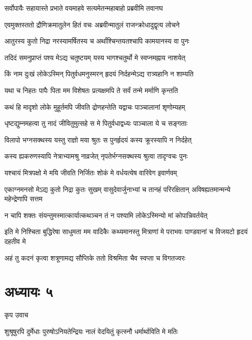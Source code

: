 \twolineshloka
{सर्वोपायैः सहायास्ते प्रभाते वयमाहवे}
{सत्यमेतन्महाबाहो प्रब्रवीमि तवानघ}


\twolineshloka
{एवमुक्तस्ततो द्रौणिक्रमातुलेन हितं वचः}
{अब्रवीन्मातुलं राजन्क्रोधादुद्वृत्य लोचने}


\twolineshloka
{आतुरस्य कुतो निद्रा नरस्यामर्षितस्य च}
{अर्थांश्चिन्तयतश्चापि कामयानस्य वा पुनः}


\twolineshloka
{तदिदं समनुप्राप्तं पश्य मेऽद्य चतुष्टयम्}
{यस्य भागश्चतुर्थो मे स्वप्नमह्नाय नाशयेत्}


\twolineshloka
{किं नाम दुःखं लोकेऽस्मिन् पितुर्वधमनुस्मरन्}
{हृदयं निर्दहन्मेऽद्य रात्र्यहानि न शाम्यति}


\twolineshloka
{यथा च निहतः पापैः पिता मम विशेषतः}
{प्रत्यक्षमपि ते सर्वं तन्मे मर्माणि कृन्तति}


\twolineshloka
{कथं हि मादृशो लोके मुहूर्तमपि जीवति}
{द्रोणहन्तेति यद्वाचः पाञ्चालानां शृणोम्यहम्}


\twolineshloka
{धृष्टद्युम्नमहत्वा तु नादं जीवितुमुत्सहे}
{स मे पितुर्वधाद्वध्यः पाञ्चाला ये च सङ्गताः}


\twolineshloka
{विलापो भग्नसक्थस्य यस्तु राज्ञो मया श्रुतः}
{स पुनर्हृदयं कस्य क्रूरस्यापि न निर्दहेत्}


\twolineshloka
{कस्य ह्यकरुणस्यापि नेत्राभ्यामश्रु नाव्रजेत्}
{नृपतेर्भग्नसक्थस्य श्रुत्वा तादृग्वचः पुनः}


\twolineshloka
{यश्चायं मित्रपक्षो मे मयि जीवति निर्जितः}
{शोकं मे वर्धयत्येष वारिवेग इवार्णवम्}


एकाग्नमनसो मेऽद्य कुतो निद्रा कुतः सुखम्
\twolineshloka
{वासुदेवार्जुनाभ्यां च तानहं परिरक्षितान्}
{अविषह्यतमान्मन्ये महेन्द्रेणापि सत्तम}


\twolineshloka
{न चापि शक्तः संयन्तुमस्मात्कार्यात्कथञ्चन}
{तं न पश्यामि लोकेऽस्मिन्यो मां कोपान्निवर्तयेत्}


इति मे निश्चिता बुद्धिरेषा साधुमता मम
\twolineshloka
{वादिकैः कथ्यमानस्तु मित्राणां मे पराभवः}
{पाण्डवानां च विजयटो हृदयं दहतीव मे}


\twolineshloka
{अहं तु कदनं कृत्वा शत्रूणामद्य सौप्तिके}
{ततो विश्रमिता चैव स्वप्ता च विगतज्वरः}


\chapter{अध्यायः ५}
\twolineshloka
{कृप उवाच}
{}


\twolineshloka
{शुश्रूषुरपि दुर्मेधाः पुरुषोऽनियतेन्द्रियः}
{नालं वेदयितुं कृत्स्नौ धर्मार्थाविति मे मतिः}


